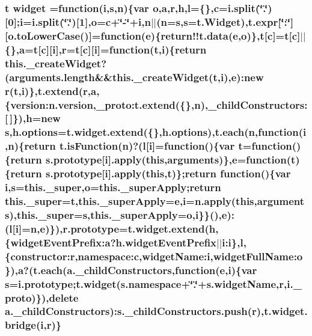 \hypertarget{root_2static_2root_2js_2bootstrap_2jquery-ui-1_810_84_8custom_8min_8js_a30f7a72454f929861983831b9dad57c6}{
\subsubsection[{widget}]{ {\bf t} widget =function({\bf i},{\bf s},{\bf n})\{var {\bf o},{\bf a},{\bf r},{\bf h},{\bf l}=\{\},{\bf c}=i.\-split(\char`\"{}.\char`\"{})\mbox{[}0\mbox{]};{\bf i}=i.\-split(\char`\"{}.\char`\"{})\mbox{[}1\mbox{]},{\bf o}={\bf c}+\char`\"{}-\/\char`\"{}+{\bf i},{\bf n}$\vert$$\vert$({\bf n}={\bf s},{\bf s}={\bf t.\-Widget}),{\bf t.\-expr}\mbox{[}\char`\"{}\-:\char`\"{}\mbox{]}\mbox{[}o.\-to\-Lower\-Case()\mbox{]}=function({\bf e})\{{\bf return!!t.\-data}({\bf e},{\bf o})\},{\bf t}\mbox{[}{\bf c}\mbox{]}={\bf t}\mbox{[}{\bf c}\mbox{]}$\vert$$\vert$\{\},{\bf a}={\bf t}\mbox{[}{\bf c}\mbox{]}\mbox{[}{\bf i}\mbox{]},{\bf r}={\bf t}\mbox{[}{\bf c}\mbox{]}\mbox{[}{\bf i}\mbox{]}=function({\bf t},{\bf i})\{return this.\-\_\-create\-Widget?(arguments.\-length\&\&this.\-\_\-create\-Widget({\bf t},{\bf i}),{\bf e})\-:new {\bf r}({\bf t},{\bf i})\},{\bf t.\-extend}({\bf r},{\bf a},\{version\-:n.\-version,{\bf \-\_\-proto\-:t.\-extend}(\{\},{\bf n}),\-\_\-child\-Constructors\-:\mbox{[}$\,$\mbox{]}\}),{\bf h}=new {\bf s},h.\-options={\bf t.\-widget.\-extend}(\{\},h.\-options),{\bf t.\-each}({\bf n},function({\bf i},{\bf n})\{return t.\-is\-Function({\bf n})?({\bf l}\mbox{[}{\bf i}\mbox{]}=function()\{var {\bf t}=function()\{return {\bf s.\-prototype}\mbox{[}{\bf i}\mbox{]}.apply(this,arguments)\},{\bf e}=function({\bf t})\{return {\bf s.\-prototype}\mbox{[}{\bf i}\mbox{]}.apply(this,{\bf t})\};return function()\{var {\bf i},{\bf s}=this.\-\_\-super,{\bf o}=this.\-\_\-super\-Apply;return this.\-\_\-super={\bf t},this.\-\_\-super\-Apply={\bf e},{\bf i}=n.\-apply(this,arguments),this.\-\_\-super={\bf s},this.\-\_\-super\-Apply={\bf o},{\bf i}\}\}(),{\bf e})\-:({\bf l}\mbox{[}{\bf i}\mbox{]}={\bf n},{\bf e})\}),{\bf r.\-prototype}={\bf t.\-widget.\-extend}({\bf h},\{widget\-Event\-Prefix\-:a?h.\-widget\-Event\-Prefix$\vert$$\vert$i\-:i\},{\bf l},\{constructor\-:r,namespace\-:c,widget\-Name\-:i,widget\-Full\-Name\-:o\}),{\bf a}?({\bf t.\-each}({\bf a.\-\_\-child\-Constructors},function({\bf e},{\bf i})\{var {\bf s}={\bf i.\-prototype};t.\-widget(s.\-namespace+\char`\"{}.\char`\"{}+s.\-widget\-Name,{\bf r},i.\-\_\-proto)\}),delete {\bf a.\-\_\-child\-Constructors})\-:s.\-\_\-child\-Constructors.\-push({\bf r}),{\bf t.\-widget.\-bridge}({\bf i},{\bf r})\}}}\label{root_2static_2root_2js_2bootstrap_2jquery-ui-1_810_84_8custom_8min_8js_a30f7a72454f929861983831b9dad57c6}
